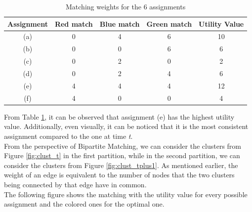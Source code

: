 \begin{table}[H]
  \centering
  \begin{tabular}{|c|c|c|c|c|}
    \hline
   \textbf{Assignment} & \textbf{Red match} & \textbf{Blue match} & \textbf{Green match} & \textbf{Utility Value} \\
    \hline
    (a) & 0 & 4 & 6 & 10 \\
    \hline
    (b) & 0 & 0 & 6 & 6 \\
    \hline
    (c) & 0 & 2 & 0 & 2 \\
    \hline
    (d) & 0 & 2 & 4 & 6 \\
    \hline
    (e) & 4 & 4 & 4 & 12 \\
    \hline
    (f) & 4 & 0 & 0 & 4 \\
    \hline
  \end{tabular}
  
  \vspace{0.5cm} %
  
  \caption{Matching weights for the 6 assignments}
  \label{tab:table_clust}
\end{table}
 
From Table \ref{tab:table_clust}, it can be observed that assignment (e) has the highest utility value.
Additionally, even visually, it can be noticed that it is the most consistent assignment compared to the one at time \textit{t}.
\\

From the perspective of Bipartite Matching, we can consider the clusters from Figure \ref{fig:clust_t} in the first partition, while in the second partition, we can consider the clusters from Figure \ref{fig:clust_tplus1}.
As mentioned earlier, the weight of an edge is equivalent to the number of nodes that the two clusters being connected by that edge have in common. \\
The following figure shows the matching with the utility value for every possible assignment and the colored ones for the optimal one.



